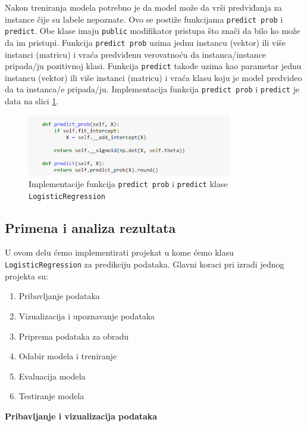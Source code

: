 \documentclass[a4paper,12pt]{report}
\begin{document}
Nakon treniranja modela potrebno je da model može da vrši predviđanja za instance čije su labele nepoznate. Ovo se postiže funkcijama \texttt{predict prob} i \texttt{predict}. Obe klase imaju \texttt{public} modifikator pristupa što znači da bilo ko može da im pristupi. Funkcija \texttt{predict prob} uzima jednu instancu (vektor) ili više instanci (matricu)  i vraća predviđenu verovatnoću da instanca/instance pripada/ju pozitivnoj klasi. Funkcija \texttt{predict} takođe uzima kao parametar jednu instancu (vektor) ili više instanci (matricu) i vraća klasu koju je model predvideo da ta instanca/e pripada/ju.  Implementacija funkcija \texttt{predict prob} i \texttt{predict} je data na slici \ref{fig:logpred}.

\begin{figure}[h]
    \centering
    \includegraphics[width=0.8\textwidth]{logistic_predict.png}
    \caption{Implementacije funkcija \texttt{predict prob} i \texttt{predict} klase \texttt{LogisticRegression}}\label{fig:logpred}
\end{figure}

\subsection{Primena i analiza rezultata}
 \label{chap:primenalogistic}
 
U ovom delu ćemo implementirati projekat u kome ćemo klasu \texttt{LogisticRegression} za predikciju podataka. Glavni koraci pri izradi jednog projekta su: 
\begin{enumerate}
\item Pribavljanje podataka
\item Vizualizacija i upoznavanje podataka
\item Priprema podataka za obradu
\item Odabir modela i treniranje
\item Evaluacija modela
\item Testiranje modela
\end{enumerate}

\textbf{Pribavljanje i vizualizacija podataka}\\
 
\end{document}
